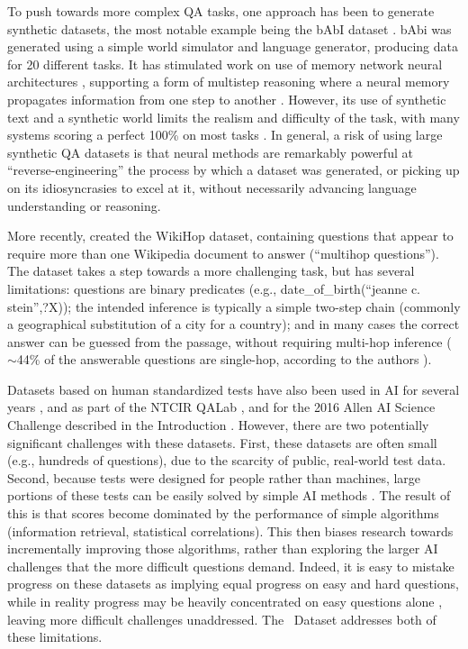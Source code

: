 To push towards more complex QA tasks, one approach has been to generate synthetic datasets, the most notable example being the bAbI dataset \cite{weston2015towards}. bAbi was generated using a simple world simulator and language generator, producing data for 20 different tasks. It has stimulated work on use of memory network neural architectures \cite{weston2014memory}, supporting a form of multistep reasoning where a neural memory propagates information from one step to another
\cite[e.g.][]{Henaff2016TrackingTW,Seo2017QueryReductionNF}.
However, its use of synthetic text and a synthetic world limits the realism and difficulty of the task, with many systems scoring a perfect 100\% on most tasks \cite[e.g.][]{weston2014memory}.
In general, a risk of using large synthetic QA datasets is that neural methods are remarkably powerful at ``reverse-engineering'' the process by which a dataset was generated, or picking up on its idiosyncrasies to excel at it, without necessarily advancing language understanding or reasoning. 

More recently, \citet{welbl2017constructing} created the WikiHop dataset, containing questions that appear to require more than one Wikipedia document to answer (``multihop questions''). The dataset takes a step towards a more challenging task, but has several limitations: questions are binary predicates (e.g., date\_of\_birth(``jeanne c. stein'',?X)); the intended inference is typically a simple two-step chain (commonly a geographical substitution of a city for a country); and in many cases the correct answer can be guessed from the passage, without requiring multi-hop inference ($\sim$44\% of the answerable questions are single-hop, according to the authors \cite{welbl2017constructing}).

Datasets based on human standardized tests have also been used in AI for several years \cite[e.g.][]{clark2016combining,seo2014diagram,fujita2014overview,strickland},
and as part of the NTCIR QALab \cite{ntcir13}, and for the 2016 Allen AI Science Challenge described in the Introduction \cite{schoenick2017moving}. However, there are two potentially significant challenges with these datasets. First, these datasets are often small (e.g., hundreds of questions), due to the scarcity of public, real-world test data. Second, because tests were designed for people rather than machines, large portions of these tests can be easily solved by simple AI methods
\cite[e.g.][]{davis2016write,clark2016combining}. The result of this is that scores become dominated by the performance of simple algorithms (information retrieval, statistical correlations). This then biases research towards incrementally improving those algorithms, rather than exploring the larger AI challenges that the more difficult questions demand. Indeed, it is easy to mistake progress on these datasets as implying equal progress on easy and hard questions, while in reality progress may be heavily concentrated on easy questions alone \cite{Gururangan:2018}, leaving more difficult challenges unaddressed. The \ASC~Dataset addresses both of these limitations.

